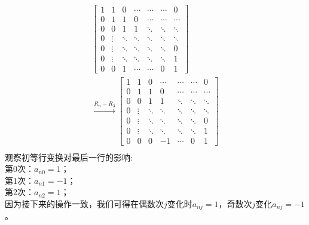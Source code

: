 \documentclass{article}
\begin{document}
\begin{align*}
\begin{bmatrix}
    1 & 1      & 0      & \cdots & \cdots & \cdots & 0      \\
    0 & 1      & 1      & 0      & \cdots & \cdots & \cdots \\
    0 & 0      & 1      & 1      & \ddots & \ddots & \ddots \\
    0 & \vdots & \ddots & \ddots & \ddots & \ddots & \ddots \\
    0 & \vdots & \ddots & \ddots & \ddots & \ddots & 0      \\
    0 & \vdots & \ddots & \ddots & \ddots & \ddots & 1      \\
    0 & 0      & 1      & \cdots & \cdots & 0      & 1
  \end{bmatrix} \\
  \xrightarrow{R_n - R_3}
  \begin{bmatrix}
    1 & 1      & 0      & \cdots & \cdots & \cdots & 0      \\
    0 & 1      & 1      & 0      & \cdots & \cdots & \cdots \\
    0 & 0      & 1      & 1      & \ddots & \ddots & \ddots \\
    0 & \vdots & \ddots & \ddots & \ddots & \ddots & \ddots \\
    0 & \vdots & \ddots & \ddots & \ddots & \ddots & 0      \\
    0 & \vdots & \ddots & \ddots & \ddots & \ddots & 1      \\
    0 & 0      & 0      & -1     & \cdots & 0      & 1
  \end{bmatrix} \\
\end{align*}
观察初等行变换对最后一行的影响: \\
第0次：$a_{n0} = 1$； \\
第1次：$a_{n1} = -1$；\\
第2次：$a_{n2} = 1$；\\
因为接下来的操作一致，我们可得在偶数次$j$变化时$a_{nj} = 1$，奇数次$j$变化$a_{nj} = -1$。
\end{document}
